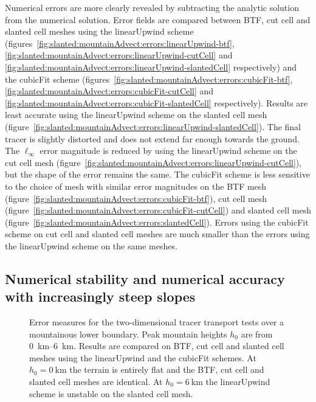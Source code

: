 Numerical errors are more clearly revealed by subtracting the analytic solution from the numerical solution.
Error fields are compared between BTF, cut cell and slanted cell meshes using the linearUpwind scheme (figures~\ref{fig:slanted:mountainAdvect:errors:linearUpwind-btf},
\ref{fig:slanted:mountainAdvect:errors:linearUpwind-cutCell} and
\ref{fig:slanted:mountainAdvect:errors:linearUpwind-slantedCell} respectively) and the cubicFit scheme (figures~\ref{fig:slanted:mountainAdvect:errors:cubicFit-btf},
\ref{fig:slanted:mountainAdvect:errors:cubicFit-cutCell} and
\ref{fig:slanted:mountainAdvect:errors:cubicFit-slantedCell} respectively).
Results are least accurate using the linearUpwind scheme on the slanted cell mesh (figure~\ref{fig:slanted:mountainAdvect:errors:linearUpwind-slantedCell}).  The final tracer is slightly distorted and does not extend far enough towards the ground.
The $\ell_\infty$ error magnitude is reduced by using the linearUpwind scheme on the cut cell mesh (figure~\ref{fig:slanted:mountainAdvect:errors:linearUpwind-cutCell}), but the shape of the error remains the same.
The cubicFit scheme is less sensitive to the choice of mesh with similar error magnitudes on the BTF mesh (figure~\ref{fig:slanted:mountainAdvect:errors:cubicFit-btf}), cut cell mesh (figure~\ref{fig:slanted:mountainAdvect:errors:cubicFit-cutCell}) and slanted cell mesh (figure~\ref{fig:slanted:mountainAdvect:errors:slantedCell}).  Errors using the cubicFit scheme on cut cell and slanted cell meshes are much smaller than the errors using the linearUpwind scheme on the same meshes.

\subsection{Numerical stability and numerical accuracy with increasingly steep slopes}

\begin{figure}
	\centering
%
	\caption{Error measures for the two-dimensional tracer transport tests over a mountainous lower boundary.  Peak mountain heights $h_0$ are from \SIrange{0}{6}{\kilo\meter}.  Results are compared on BTF, cut cell and slanted cell meshes using the linearUpwind and the cubicFit schemes.  At $h_0 = \SI{0}{\kilo\meter}$ the terrain is entirely flat and the BTF, cut cell and slanted cell meshes are identical.  At $h_0 = \SI{6}{\kilo\meter}$ the linearUpwind scheme is unstable on the slanted cell mesh.}
	\label{fig:slanted:mountainAdvect:l2ByMountainHeight}
\end{figure}

